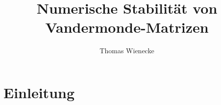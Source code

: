 \documentclass[a4paper, oneside, 11pt]{scrreprt}
\title{Numerische Stabilität von Vandermonde-Matrizen}
\author{Thomas Wienecke}
\begin{document}
\maketitle
\tableofcontents

\chapter{Einleitung}

%








\end{document}
